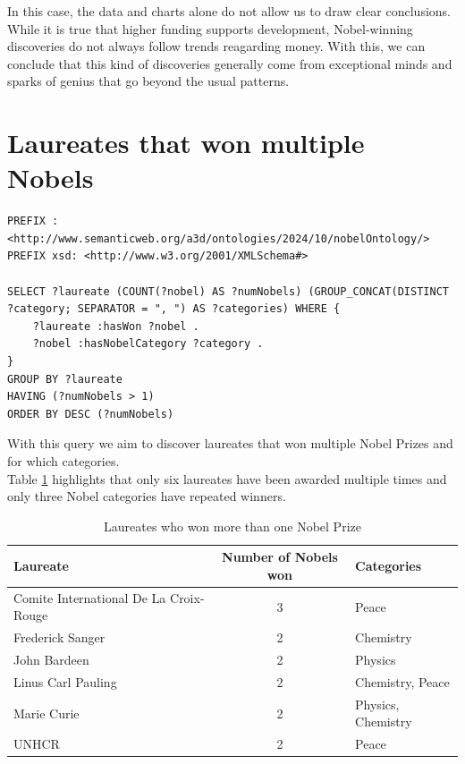 \documentclass{article}
\begin{document}
In this case, the data and charts alone do not allow us to draw clear conclusions. While it is true that higher
funding supports development, Nobel-winning discoveries do not always follow trends reagarding money. With this,
we can conclude that this kind of discoveries generally come from exceptional minds and sparks of genius that
go beyond the usual patterns.


\section{Laureates that won multiple Nobels}

\begin{lstlisting}
PREFIX : <http://www.semanticweb.org/a3d/ontologies/2024/10/nobelOntology/>
PREFIX xsd: <http://www.w3.org/2001/XMLSchema#>

SELECT ?laureate (COUNT(?nobel) AS ?numNobels) (GROUP_CONCAT(DISTINCT ?category; SEPARATOR = ", ") AS ?categories) WHERE {
    ?laureate :hasWon ?nobel .
    ?nobel :hasNobelCategory ?category .
}
GROUP BY ?laureate
HAVING (?numNobels > 1)
ORDER BY DESC (?numNobels)
\end{lstlisting}

\vspace{1em}

With this query we aim to discover laureates that won multiple Nobel Prizes and for which categories.\\
Table \ref{tab:moreThanOneNobel} highlights that only six laureates have been awarded multiple times and only three
Nobel categories have repeated winners.

\begin{table}[H]
	\centering
	\caption{Laureates who won more than one Nobel Prize}
	\begin{tabular}{|l|c|l|}
		\hline
		\textbf{Laureate}                      & \textbf{Number of Nobels won} & \textbf{Categories} \\ \hline
		Comite International De La Croix-Rouge & 3                             & Peace               \\ \hline
		Frederick Sanger                       & 2                             & Chemistry           \\ \hline
		John Bardeen                           & 2                             & Physics             \\ \hline
		Linus Carl Pauling                     & 2                             & Chemistry, Peace    \\ \hline
		Marie Curie                            & 2                             & Physics, Chemistry  \\ \hline
		UNHCR                                  & 2                             & Peace               \\ \hline
	\end{tabular}
	\label{tab:moreThanOneNobel}
\end{table}
\end{document}
